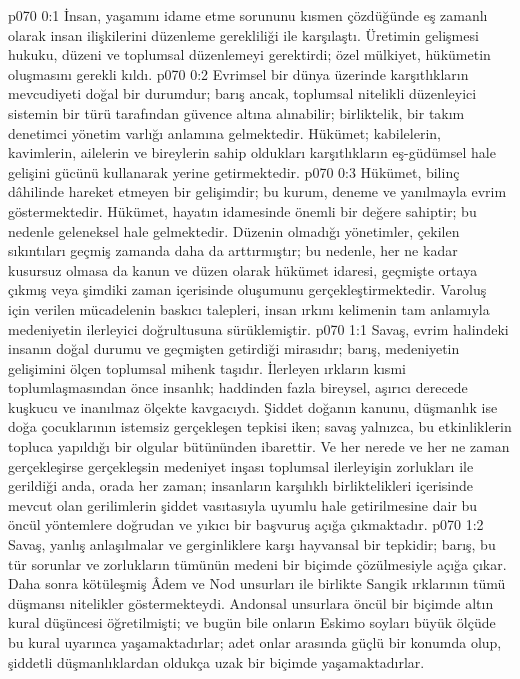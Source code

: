 \vs p070 0:1 İnsan, yaşamını idame etme sorununu kısmen çözdüğünde eş zamanlı olarak insan ilişkilerini düzenleme gerekliliği ile karşılaştı. Üretimin gelişmesi hukuku, düzeni ve toplumsal düzenlemeyi gerektirdi; özel mülkiyet, hükümetin oluşmasını gerekli kıldı.
\vs p070 0:2 Evrimsel bir dünya üzerinde karşıtlıkların mevcudiyeti doğal bir durumdur; barış ancak, toplumsal nitelikli düzenleyici sistemin bir türü tarafından güvence altına alınabilir; birliktelik, bir takım denetimci yönetim varlığı anlamına gelmektedir. Hükümet; kabilelerin, kavimlerin, ailelerin ve bireylerin sahip oldukları karşıtlıkların eş\hyp{}güdümsel hale gelişini gücünü kullanarak yerine getirmektedir.
\vs p070 0:3 Hükümet, bilinç dâhilinde hareket etmeyen bir gelişimdir; bu kurum, deneme ve yanılmayla evrim göstermektedir. Hükümet, hayatın idamesinde önemli bir değere sahiptir; bu nedenle geleneksel hale gelmektedir. Düzenin olmadığı yönetimler, çekilen sıkıntıları geçmiş zamanda daha da arttırmıştır; bu nedenle, her ne kadar kusursuz olmasa da kanun ve düzen olarak hükümet idaresi, geçmişte ortaya çıkmış veya şimdiki zaman içerisinde oluşumunu gerçekleştirmektedir. Varoluş için verilen mücadelenin baskıcı talepleri, insan ırkını kelimenin tam anlamıyla medeniyetin ilerleyici doğrultusuna sürüklemiştir.
\vs p070 1:1 Savaş, evrim halindeki insanın doğal durumu ve geçmişten getirdiği mirasıdır; barış, medeniyetin gelişimini ölçen toplumsal mihenk taşıdır. İlerleyen ırkların kısmi toplumlaşmasından önce insanlık; haddinden fazla bireysel, aşırıcı derecede kuşkucu ve inanılmaz ölçekte kavgacıydı. Şiddet doğanın kanunu, düşmanlık ise doğa çocuklarının istemsiz gerçekleşen tepkisi iken; savaş yalnızca, bu etkinliklerin topluca yapıldığı bir olgular bütününden ibarettir. Ve her nerede ve her ne zaman gerçekleşirse gerçekleşsin medeniyet inşası toplumsal ilerleyişin zorlukları ile gerildiği anda, orada her zaman; insanların karşılıklı birliktelikleri içerisinde mevcut olan gerilimlerin şiddet vasıtasıyla uyumlu hale getirilmesine dair bu öncül yöntemlere doğrudan ve yıkıcı bir başvuruş açığa çıkmaktadır.
\vs p070 1:2 Savaş, yanlış anlaşılmalar ve gerginliklere karşı hayvansal bir tepkidir; barış, bu tür sorunlar ve zorlukların tümünün medeni bir biçimde çözülmesiyle açığa çıkar. Daha sonra kötüleşmiş Âdem ve Nod unsurları ile birlikte Sangik ırklarının tümü düşmansı nitelikler göstermekteydi. Andonsal unsurlara öncül bir biçimde altın kural düşüncesi öğretilmişti; ve bugün bile onların Eskimo soyları büyük ölçüde bu kural uyarınca yaşamaktadırlar; adet onlar arasında güçlü bir konumda olup, şiddetli düşmanlıklardan oldukça uzak bir biçimde yaşamaktadırlar.
